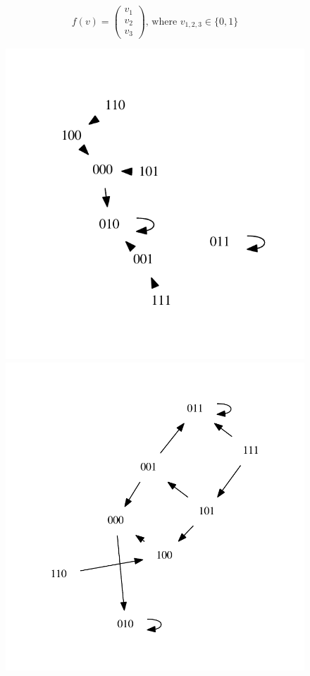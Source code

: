 \begin{equation}
f(v) =  \begin{pmatrix}
 v_1\\
 v_2\\
 v_3
\end{pmatrix}
\textrm{, where }v_{1,2,3}\in\lbrace 0,1\rbrace
\end{equation}

\begin{figure}[h]
  \centering
 \begin{varwidth}{\linewidth}
    \includegraphics[scale=.5]{./Bilder/example01_synchron_stg}
  \end{varwidth} %
  \begin{varwidth}{\linewidth}
    \includegraphics[scale=.4]{./Bilder/example01_asynchron_stg}

\end{varwidth}
\end{figure}
